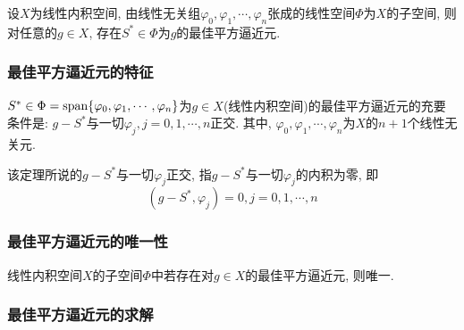 \begin{theorem}%
    设$X$为线性内积空间, 由线性无关组$\varphi_0,\varphi_1,\cdots,\varphi_n$张成的线性空间$\Phi$为$X$的子空间, 则对任意的$g\in X$, 存在$S^*\in \Phi$为$g$的最佳平方逼近元.
\end{theorem}

\subsubsection{最佳平方逼近元的特征}

\begin{theorem} %
    $S^*\in\Phi=\text{span}\{\varphi_0,\varphi_1,\cdots,\varphi_n\}$为$g\in X$(线性内积空间)的最佳平方逼近元的充要条件是: $g-S^*$与一切${\varphi_j},j=0,1,\cdots,n$正交. 其中, $\varphi_0,\varphi_1,\cdots,\varphi_n$为$X$的$n+1$个线性无关元.
\end{theorem}

该定理所说的$g-S^*$与一切$\varphi_j$正交, 指$g-S^*$与一切$\varphi_j$的内积为零, 即
\begin{equation*}
    (g-S^*,\varphi_j)=0, j=0,1,\cdots,n
\end{equation*}

\subsubsection{最佳平方逼近元的唯一性}

\begin{theorem}
    线性内积空间$X$的子空间$\Phi$中若存在对$g\in X$的最佳平方逼近元, 则唯一.
\end{theorem}

\subsubsection{最佳平方逼近元的求解}


